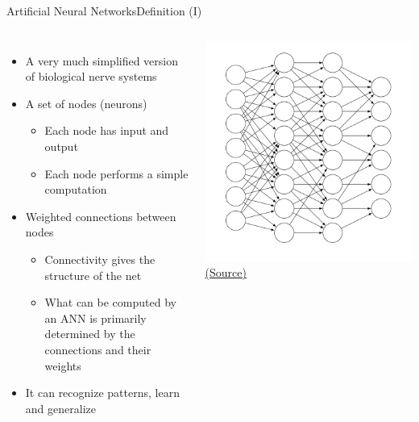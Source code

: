 \documentclass[10pt,compress]{beamer} %
\begin{document}
\begin{frame}{Artificial Neural Networks}{Definition (I)}
    \begin{columns}
	\begin{itemize}
	\item A very much simplified version of biological nerve systems
	\item A set of nodes (neurons) 
		\begin{itemize}
		\item Each node has input and output
		\item Each node performs a simple computation 
		\end{itemize}
	\item Weighted connections between nodes
		\begin{itemize}
		\item Connectivity gives the structure of the net
		\item What can be computed by an ANN is primarily determined by the connections and their weights
		\end{itemize}
	\item It can \alert{recognize patterns}, \alert{learn} and \alert{generalize}
	\end{itemize}

	\includegraphics[width=\linewidth]{figs/network2.png}
	\tiny{\href{https://tex.stackexchange.com/questions/540287/tikz-randomly-drop-connections-in-neural-network}{(Source)}}
    \end{columns}
\end{frame}
\end{document}
